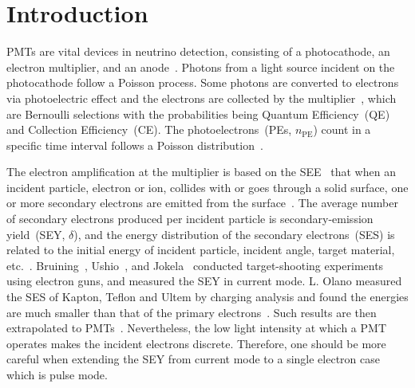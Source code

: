 \section{Introduction}\label{sec:Introduction}
PMTs are vital devices in neutrino detection,
consisting of a photocathode, an electron multiplier, and an anode~\cite{1955Scintillation}.
Photons from a light source incident on the photocathode follow a Poisson process.
Some photons are converted to electrons via photoelectric effect
and the electrons are collected by the multiplier~\cite{2016Optimization},
which are Bernoulli selections with the probabilities being Quantum Efficiency~(QE) and Collection Efficiency~(CE).
The photoelectrons~(PEs, $n_{\mathrm{PE}}$) count in a specific time interval follows a Poisson distribution~\cite{1994Absolute}.

The electron amplification at the multiplier is based on the SEE~\cite{2021Summary} that
when an incident particle, electron or ion,
collides with or goes through a solid surface, one or more secondary electrons are emitted from the surface~\cite{2015Secondary}.
The average number of secondary electrons produced per incident particle is secondary-emission yield~(SEY, $\delta$),
and the energy distribution of the secondary electrons~(SES) is related to the initial energy of incident particle,
incident angle, target material, etc.~\cite{2002Probabilistic}.
Bruining~\cite{1938Secondary}, Ushio~\cite{1988Secondary}, and Jokela~\cite{2012Secondary}
conducted target-shooting experiments using electron guns,
and measured the SEY in current mode.
L. Olano measured the SES of Kapton, Teflon and Ultem by charging analysis and found the
energies are much smaller than that of the primary electrons~\cite{OLANO2020103456}.
Such results are then extrapolated to PMTs~\cite{2012An,2021Effects}.
Nevertheless, the low light intensity at which a PMT operates makes the incident electrons discrete.
Therefore, one should be more careful when extending the SEY from current mode to a single electron case which is pulse mode.


